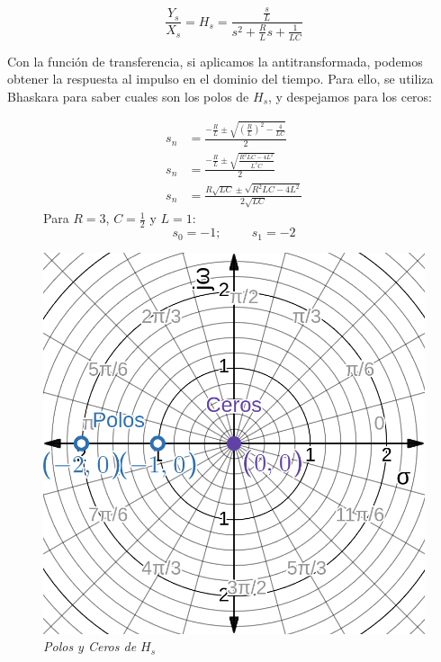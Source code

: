 \documentclass[12pt,a4paper]{report}
\begin{document}
\begin{enumerate}[label=\alph*)]
      \begin{equation*}
        \frac{Y_s}{X_s} = H_s = \frac{\frac{s}{L}}{s^2 + \frac{R}{L} s + \frac{1}{LC}}
      \end{equation*}

      Con la función de transferencia, si aplicamos la antitransformada, podemos obtener la respuesta al impulso en el
      dominio del tiempo. Para ello, se utiliza Bhaskara para saber cuales son los polos de $H_s$, y despejamos para los
      ceros:
      \vspace{-1mm}
      \noindent
      \begin{figure}[h]
        \centering
        \begin{minipage}[h]{0.38\textwidth}
          \begin{align*}
            s_n &= \frac{-\frac{R}{L} \pm \sqrt{\left(\frac{R}{L}\right)^2 - \frac{4}{LC}}}{2}\\[6pt]
            s_n &= \frac{-\frac{R}{L} \pm \sqrt{\frac{R^2LC - 4L^2}{L^3C}}}{2}\\[6pt]
            s_n &= \frac{R\sqrt{LC} \pm \sqrt{R^2LC - 4L^2}}{2\sqrt{LC}}
          \end{align*}
          Para $R = 3$, $C = \frac{1}{2}$ y $L = 1$:
          \begin{equation*}
            s_0 = -1; \hspace{1cm}s_1 = -2
          \end{equation*}
        \end{minipage}
        \begin{minipage}[h]{0.38\textwidth}
          \centering
          \includegraphics[width=1\textwidth]{./images/ej4.6.png}
          \textit{Polos y Ceros de $H_s$}
        \end{minipage}
      \end{figure}
      

\end{enumerate}
\end{document}

